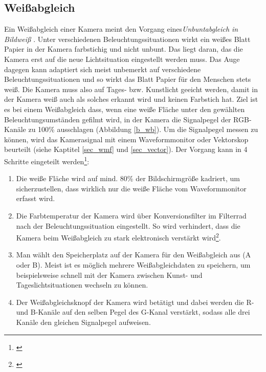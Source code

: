 \subsection{Weißabgleich}
\label{sec_wb}
Ein Weißabgleich einer Kamera meint den Vorgang eines\emph{\glqq Unbuntabgleich in Bildweiß\grqq} \citep[414]{schmidt}. Unter verschiedenen Beleuchtungssituationen wirkt ein weißes Blatt Papier in der Kamera farbstichig und nicht unbunt. Das liegt daran, das die Kamera erst auf die neue Lichtsituation eingestellt werden muss. Das Auge dagegen kann adaptiert sich meist unbemerkt auf verschiedene Beleuchtungssituationen und so wirkt das Blatt Papier für den Menschen stets weiß. Die Kamera muss also auf Tages- bzw. Kunstlicht geeicht werden, damit in der Kamera weiß auch als solches erkannt wird und keinen Farbstich hat. Ziel ist es bei einem Weißabgleich dass, wenn eine weiße Fläche unter den gewählten Beleuchtungsumständen gefilmt wird, in der Kamera die Signalpegel der RGB-Kanäle zu 100\% ausschlagen (Abbildung \ref{b_wb}). Um die Signalpegel messen zu können, wird das Kamerasignal mit einem Waveformmonitor oder Vektorskop beurteilt (siehe Kaptitel \ref{sec_wmf} und \ref{sec_vector}). Der Vorgang kann in 4 Schritte eingeteilt werden\footnote{\cite[206]{heinen}}:

\begin{enumerate}
\item Die weiße Fläche wird auf mind. 80\% der Bildschirmgröße kadriert, um sicherzustellen, dass wirklich nur die weiße Fläche vom Waveformmonitor erfasst wird.
\item Die Farbtemperatur der Kamera wird über Konversionsfilter im Filterrad nach der Beleuchtungssituation eingestellt. So wird verhindert, dass die Kamera beim Weißabgleich zu stark elektronisch verstärkt wird\footnote{\cite[415]{schmidt}}.
\item Man wählt den Speicherplatz auf der Kamera für den Weißabgleich aus (A oder B). Meist ist es möglich mehrere Weißabgleichdaten zu speichern, um beispielsweise schnell mit der Kamera zwischen Kunst- und Tageslichtsituationen wechseln zu können.
\item Der Weißabgleichsknopf der Kamera wird betätigt und dabei werden die R- und B-Kanäle auf den selben Pegel des G-Kanal verstärkt, sodass alle drei Kanäle den gleichen Signalpegel aufweisen.
\end{enumerate}

